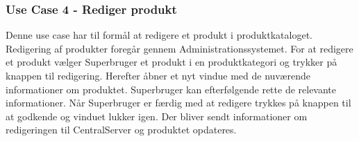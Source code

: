 \subsubsection{Use Case 4 - Rediger produkt}
Denne use case har til formål at redigere et produkt i produktkataloget. Redigering af produkter foregår gennem Administrationssystemet. For at redigere et produkt vælger Superbruger et produkt i en produktkategori og trykker på knappen til redigering. Herefter åbner et nyt vindue med de nuværende informationer om produktet. Superbruger kan efterfølgende rette de relevante informationer. Når Superbruger er færdig med at redigere trykkes på knappen til at godkende og vinduet lukker igen. Der bliver sendt informationer om redigeringen til CentralServer og produktet opdateres.